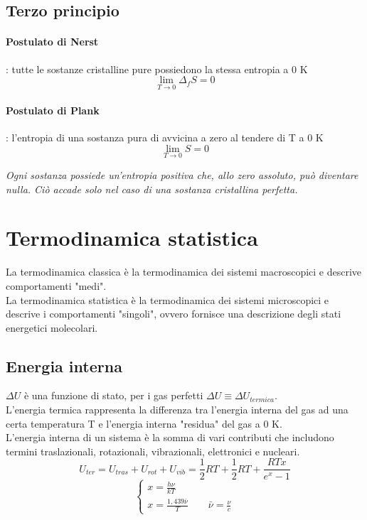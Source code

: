 \documentclass{article}
\begin{document}
\subsection{Terzo principio}
\paragraph{Postulato di Nerst}: tutte le sostanze cristalline pure possiedono la stessa entropia a 0 K 
\begin{equation*}
    \lim_{T\to0}\Delta_fS=0
\end{equation*}
\paragraph{Postulato di Plank}: l'entropia di una sostanza pura di avvicina a zero al tendere di T a 0 K
\begin{equation*}
    \lim_{T\to0}S=0
\end{equation*}

\begin{center}
    \textit{Ogni sostanza possiede un'entropia positiva che, allo zero assoluto, può diventare nulla. Ciò accade solo nel caso di una sostanza cristallina perfetta.}
\end{center}

\newpage

\section{Termodinamica statistica}
La termodinamica classica è la termodinamica dei sistemi macroscopici e descrive comportamenti "medi". \\
La termodinamica statistica è la termodinamica dei sistemi microscopici e descrive i comportamenti "singoli", ovvero fornisce una descrizione degli stati energetici molecolari.

\subsection{Energia interna}
$\Delta U$ è una funzione di stato, per i gas perfetti $\Delta U \equiv \Delta U_{termica}$.\\
L'energia termica rappresenta la differenza tra l'energia interna del gas ad una certa temperatura T e l'energia interna "residua" del gas a 0 K. \\
L'energia interna di un sistema è la somma di vari contributi che includono termini traslazionali, rotazionali, vibrazionali, elettronici e nucleari.
\begin{equation*}
    U_{ter}=U_{tras}+U_{rot}+U_{vib}=\frac{1}{2}RT+\frac{1}{2}RT+\frac{RTx}{e^x-1}
\end{equation*}
\begin{equation*}
    \begin{cases}
    x=\frac{h\nu}{kT}\\
    x=\frac{1,439 \bar\nu}{T} \quad \quad \bar\nu=\frac{\nu}{c}
\end{cases}
\end{equation*}
\end{document}
